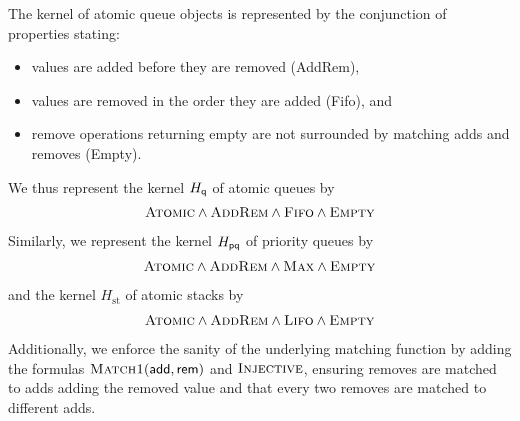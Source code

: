 \begin{example}

  The kernel of atomic queue objects is represented by the conjunction of properties stating:
  \begin{itemize}

    \item values are added before they are removed ({\sc AddRem}),

    \item values are removed in the order they are added ({\sc Fifo}), and

    \item remove operations returning empty are not surrounded by matching adds
    and removes ({\sc Empty}).

  \end{itemize}
  We thus represent the kernel $H_{\sf q}$ of atomic queues by
  \begin{align*}
    \textsc{Atomic}  \land \textsc{AddRem}
      \land \textsc{Fifo} \land \textsc{Empty}
  \end{align*}
  Similarly, we represent the kernel $H_{\sf pq}$ of priority queues by
  \begin{align*}
    \textsc{Atomic} \land \textsc{AddRem}
      \land \textsc{Max} \land \textsc{Empty}
  \end{align*}
  and the kernel $H_\mathrm{st}$ of atomic stacks by
  \begin{align*}
    \textsc{Atomic} \land \textsc{AddRem}
      \land \textsc{Lifo} \land \textsc{Empty}
  \end{align*}
  Additionally, we enforce the sanity of the underlying matching function by
  adding the formulas $\textsc{Match1}({\sf add},{\sf
  rem})$ and $\textsc{Injective}$, ensuring removes are matched to adds adding 
  the removed value and that every two removes are matched to different adds.

\end{example}

